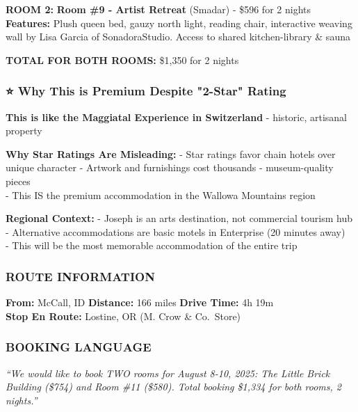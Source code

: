 \documentclass[
  10pt,
]{article}
\begin{document}
\textbf{\textcolor{primary}{ROOM 2:}} \textbf{Room \#9 - Artist Retreat}
(Smadar) - \$596 for 2 nights\\
\textbf{\textcolor{secondary}{Features:}} Plush queen bed, gauzy north
light, reading chair, interactive weaving wall by Lisa Garcia of
SonadoraStudio. Access to shared kitchen-library \& sauna

\textbf{\textcolor{primary}{TOTAL FOR BOTH ROOMS:}} \$1,350 for 2 nights

\subsubsection{\texorpdfstring{\textcolor{primary}{⭐ Why This is Premium Despite "2-Star" Rating}}{}}\label{section-27}

\textbf{\textcolor{secondary}{This is like the Maggiatal Experience in Switzerland}}
- historic, artisanal property

\textbf{\textcolor{primary}{Why Star Ratings Are Misleading:}} - Star
ratings favor chain hotels over unique character - Artwork and
furnishings cost thousands - museum-quality pieces\\
- This IS the premium accommodation in the Wallowa Mountains region

\textbf{\textcolor{primary}{Regional Context:}} - Joseph is an arts
destination, not commercial tourism hub - Alternative accommodations are
basic motels in Enterprise (20 minutes away)\\
- This will be the most memorable accommodation of the entire trip

\subsubsection{\texorpdfstring{\textcolor{primary}{ROUTE INFORMATION}}{}}\label{section-28}

\textbf{\textcolor{secondary}{From:}} McCall, ID \textbar{}
\textbf{\textcolor{secondary}{Distance:}} 166 miles \textbar{}
\textbf{\textcolor{secondary}{Drive Time:}} 4h 19m\\
\textbf{\textcolor{secondary}{Stop En Route:}} Lostine, OR (M. Crow \&
Co.~Store)

\subsubsection{\texorpdfstring{\textcolor{primary}{BOOKING LANGUAGE}}{}}\label{section-29}

\emph{``We would like to book TWO rooms for August 8-10, 2025: The
Little Brick Building (\$754) and Room \#11 (\$580). Total booking
\$1,334 for both rooms, 2 nights.''}
\end{document}
